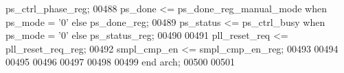 \begin{DoxyCode}
{      ps_ctrl_phase_reg};
00488 \textcolor{vhdlchar}{ps_done}        \textcolor{vhdlchar}{<=} \textcolor{vhdlchar}{ps_done_reg_manual_mode} \textcolor{keywordflow}{when} \textcolor{vhdlchar}{ps_mode} \textcolor{vhdlchar}{=} \textcolor{vhdlchar}{'}\textcolor{vhdllogic}{}\textcolor{vhdllogic}{0}\textcolor{vhdlchar}{'} \textcolor{keywordflow}{else} \textcolor{vhdlchar}{ps_done_reg};
00489 \textcolor{vhdlchar}{ps_status}      \textcolor{vhdlchar}{<=} \textcolor{vhdlchar}{ps_ctrl_busy}            \textcolor{keywordflow}{when} \textcolor{vhdlchar}{ps_mode} \textcolor{vhdlchar}{=} \textcolor{vhdlchar}{'}\textcolor{vhdllogic}{}\textcolor{vhdllogic}{0}\textcolor{vhdlchar}{'} \textcolor{keywordflow}{else} \textcolor{vhdlchar}{ps_status_reg};
00490 
00491 \textcolor{vhdlchar}{pll_reset_req}     \textcolor{vhdlchar}{<=} \textcolor{vhdlchar}{pll_reset_req_reg};
00492 \textcolor{vhdlchar}{smpl_cmp_en}       \textcolor{vhdlchar}{<=} \textcolor{vhdlchar}{smpl_cmp_en_reg};
00493 
00494 
00495 
00496 
00497 
00498   
00499 \textcolor{keywordflow}{end} \textcolor{vhdlchar}{arch};   
00500 
00501 
\end{DoxyCode}
